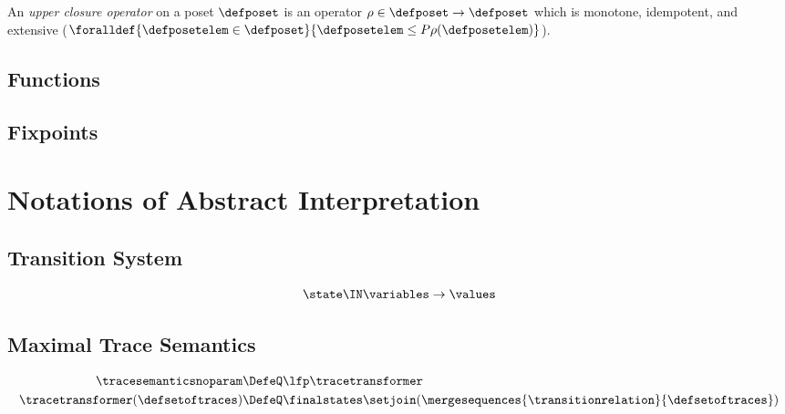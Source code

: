 \begin{definition}
  An \emph{upper closure operator} on a poset $\defposet$ is an operator $\rho\in\defposet\to\defposet$ which is monotone, idempotent, and extensive ($\foralldef{\defposetelem \in \defposet}{\defposetelem \le P \rho(\defposetelem)}$).
\end{definition}

\subsection{Functions}

\subsection{Fixpoints}

\section{Notations of Abstract Interpretation}

\subsection{Transition System}

\begin{definition}[State]
  \begin{align*}
    \state \IN \variables \to \values
  \end{align*}
\end{definition}

\subsection{Maximal Trace Semantics}

\begin{definition}
  \begin{align*}
    \tracesemanticsnoparam &\DefeQ \lfp \tracetransformer \\
    \tracetransformer(\defsetoftraces) &\DefeQ \finalstates \setjoin (\mergesequences{\transitionrelation}{\defsetoftraces})
  \end{align*}
\end{definition}

